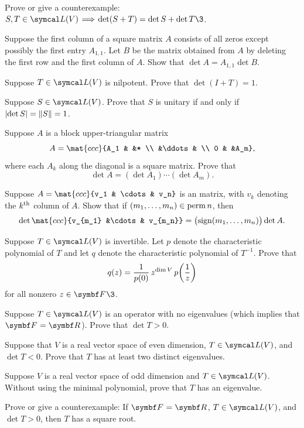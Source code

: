 \begin{exercises}

\exercise
Prove or give a counterexample: $S, T \in \L(V) \!\implies\! \det (S+T) = \det S + \det T\3$.


\exercise
Suppose the first column of a square matrix $A$ consists of all zeros except possibly the first entry $A_{1,1}$. Let $B$ be the matrix obtained from $A$ by deleting the first row and the first column of $A$. Show that $\det A = A_{1,1} \det B$.


\exercise
Suppose $T \in \L(V)$ is nilpotent. Prove that $\det(I + T) = 1$.


\exercise
Suppose $S \in \L(V)$. Prove that $S$ is unitary if and only if $\lvert\det S\rvert = \lVert S\rVert = 1$.


\exercise
Suppose $A$ is a block upper-triangular matrix \label{blockdet}
\[
A = \mat{ccc}{A_1 & &* \\ &\ddots & \\ 0 & &A_m},
\]
where each $A_k$ along the diagonal is a square matrix.  Prove that
\[
\det A = (\det A_1) \dotsm (\det A_m).
\]
\exercisedisplayend


\exercise
Suppose $A = \mat{ccc}{v_1 & \cdots & v_n}$ is an  matrix, with $v_k$ denoting the $k^{\text{{th}}}$ column of $A$. Show that if
$(m_1, \ldots, m_n) \in \operatorname{perm} n$, then
\[
\det \mat{ccc}{v_{m_1} &\cdots & v_{m_n}} = \paren[\big]{\sign(m_1, \ldots, m_n)} \det A.
\]
\exercisedisplayend


\exercise
Suppose $T \in \L(V)$ is invertible. Let $p$ denote the characteristic polynomial of $T$ and let $q$ denote the characteristic polynomial of $T^{-1}$. Prove that
\[
q(z) = \frac{1}{p(0)}\, z^{\dim V} \, p\paren[\bigg]{\frac{1}{z}}
\]
for all nonzero $z \in \F{}\3$.


\exercise
Suppose $T \in \L(V)$ is an operator with no eigenvalues (which implies that $\F{} = \R{}$). Prove that $\det T > 0$.


\exercise
Suppose that $V$ is a real vector space of even dimension, $T \in \L(V)$, and $\det T < 0$. Prove that $T$ has at least two distinct eigenvalues.


\exercise
Suppose $V$ is a real vector space of odd dimension and $T \in \L(V)$. Without using the minimal polynomial, prove that $T$ has an eigenvalue.\label{9oddeigen}


\exercise
Prove or give a counterexample: If $\F{} = \R{}$, $T \in \L(V)$, and $\det T > 0$, then $T$ has a square root.



\end{exercises}
